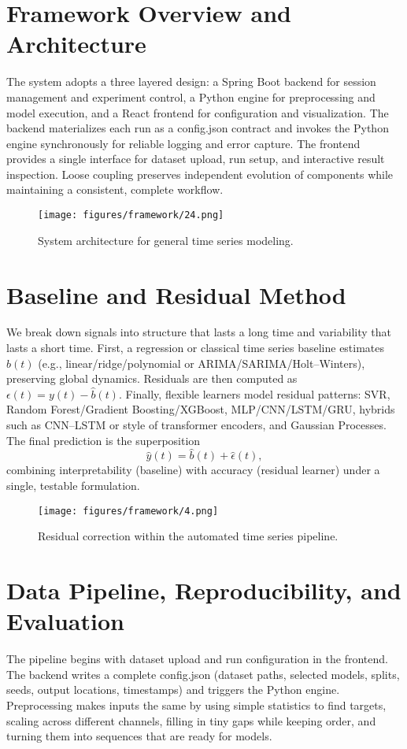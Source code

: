 \section{Framework Overview and Architecture}
The system adopts a three layered design: a Spring Boot backend for session management and experiment control, a Python engine for preprocessing and model execution, and a React frontend for configuration and visualization. The backend materializes each run as a config.json contract and invokes the Python engine synchronously for reliable logging and error capture. The frontend provides a single interface for dataset upload, run setup, and interactive result inspection. Loose coupling preserves independent evolution of components while maintaining a consistent, complete workflow.

\begin{figure}[H]
 \centering
 \texttt{[image: figures/framework/24.png]}
 \caption[System architecture for general time series modeling]{System architecture for general time series modeling.}
 \label{fig:system_architecture_ts}
\end{figure}

\section{Baseline and Residual Method}
We break down signals into structure that lasts a long time and variability that lasts a short time. First, a regression or classical time series baseline estimates $b(t)$ (e.g., linear/ridge/polynomial or ARIMA/SARIMA/Holt–Winters), preserving global dynamics. Residuals are then computed as $\epsilon(t)=y(t)-\hat{b}(t)$. Finally, flexible learners model residual patterns: SVR, Random Forest/Gradient Boosting/XGBoost, MLP/CNN/LSTM/GRU, hybrids such as CNN–LSTM or style of transformer encoders, and Gaussian Processes. The final prediction is the superposition
\[
\hat{y}(t)=\hat{b}(t)+\hat{\epsilon}(t),
\]
combining interpretability (baseline) with accuracy (residual learner) under a single, testable formulation.

\begin{figure}[htbp]
  \centering
  \texttt{[image: figures/framework/4.png]}
  \caption[Residual correction within the automated time series pipeline]{Residual correction within the automated time series pipeline.}
  \label{fig:residual_correction_ts}
\end{figure}

\section{Data Pipeline, Reproducibility, and Evaluation}
The pipeline begins with dataset upload and run configuration in the frontend. The backend writes a complete config.json (dataset paths, selected models, splits, seeds, output locations, timestamps) and triggers the Python engine. Preprocessing makes inputs the same by using simple statistics to find targets, scaling across different channels, filling in tiny gaps while keeping order, and turning them into sequences that are ready for models.

